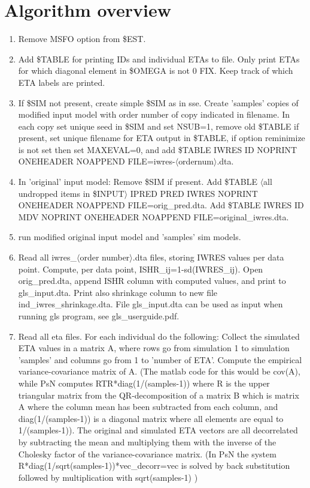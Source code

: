 \section{Algorithm overview}

\begin{enumerate}
\item Remove MSFO option from \$EST.
\item Add \$TABLE for printing IDs and individual ETAs to file. Only print ETAs for which diagonal element in \$OMEGA is not 0 FIX. Keep track of which ETA labels are printed.
\item If \$SIM not present, create simple \$SIM as in sse. Create 'samples' copies of modified input model with order number of copy indicated in filename. In each copy set unique seed in \$SIM and set NSUB=1, remove old \$TABLE if present, set unique filename for ETA output in \$TABLE, if option reminimize is not set then set MAXEVAL=0, and add \$TABLE IWRES ID NOPRINT ONEHEADER NOAPPEND FILE=iwres-$\langle$ordernum$\rangle$.dta. 
\item In 'original' input model: Remove \$SIM if present. Add \$TABLE $\langle$all undropped items in \$INPUT$\rangle$ IPRED PRED IWRES NOPRINT ONEHEADER NOAPPEND FILE=orig\_pred.dta. Add \$TABLE IWRES ID MDV NOPRINT ONEHEADER NOAPPEND FILE=original\_iwres.dta. 
\item run modified original input model and 'samples' sim models.
\item Read all iwres\_$\langle$order number$\rangle$.dta files, storing IWRES values per data point. Compute, per data point, ISHR\_ij=1-sd(IWRES\_ij). Open orig\_pred.dta, append ISHR column with computed values, and print to gls\_input.dta. Print also shrinkage column to new file ind\_iwres\_shrinkage.dta. File gls\_input.dta can be used as input when running gls program, see gls\_userguide.pdf.
\item Read all eta files. For each individual do the following: Collect the simulated ETA values in a matrix A, where rows go from simulation 1 to simulation 'samples' and columns go from 1 to 'number of ETA'. Compute the empirical variance-covariance matrix of A. 
(The matlab code for this would be cov(A), while PsN computes RTR*diag(1/(samples-1)) where R is the upper triangular matrix from the QR-decomposition of a matrix B which is matrix A where the column mean has been subtracted from each column,  and diag(1/(samples-1)) is a diagonal matrix where all elements are equal to 1/(samples-1)). 
The original and simulated ETA vectors are all decorrelated by subtracting the mean and multiplying them with the inverse of the Cholesky factor of the variance-covariance matrix. (In PsN the system  R*diag(1/sqrt(samples-1))*vec\_decorr=vec is solved by back substitution followed by multiplication with sqrt(samples-1) )

\end{enumerate}
